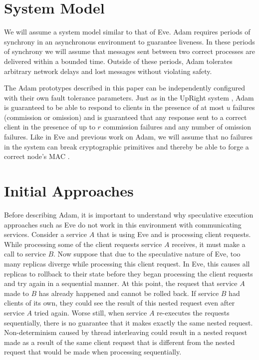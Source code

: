 \documentclass[11pt, oneside]{report}
\begin{document}
\section{System Model}
We will assume a system model similar to that of Eve. 
Adam requires periods of synchrony in an asynchronous environment to guarantee liveness. 
In these periods of synchrony we will assume that messages sent between two correct processes are delivered within a bounded time. 
Outside of these periods, Adam tolerates arbitrary network delays and lost messages without violating safety.

The Adam prototypes described in this paper can be independently configured with their own fault tolerance parameters. 
Just as in the UpRight system \cite{upRight}, Adam is guaranteed to be able to respond to clients in the presence of at most $u$ failures (commission or omission) and is guaranteed that any response sent to a correct client in the presence of up to $r$ commission failures and any number of omission failures. 
Like in Eve and previous work on Adam, we will assume that no failures in the system can break cryptographic primitives and thereby be able to forge a correct node's MAC \cite{eve, manosThesis}.

\section{Initial Approaches}

Before describing Adam, it is important to understand why speculative execution approaches such as Eve do not work in this environment with communicating services. 
Consider a service $A$ that is using Eve and is processing client requests. 
While processing some of the client requests service $A$ receives, it must make a call to service $B$. 
Now suppose that due to the speculative nature of Eve, too many replicas diverge while processing this client request. In Eve, this causes all replicas to rollback to their state before they began processing the client requests and try again in a sequential manner. 
At this point, the request that service $A$ made to $B$ has already happened and cannot be rolled back. 
If service $B$ had clients of its own, they could see the result of this nested request even after service $A$ tried again. 
Worse still, when service $A$ re-executes the requests sequentially, there is no guarantee that it makes exactly the same nested request. 
Non-determinism caused by thread interleaving could result in a nested request made as a result of the same client request that is different from the nested request that would be made when processing sequentially.
\end{document}
